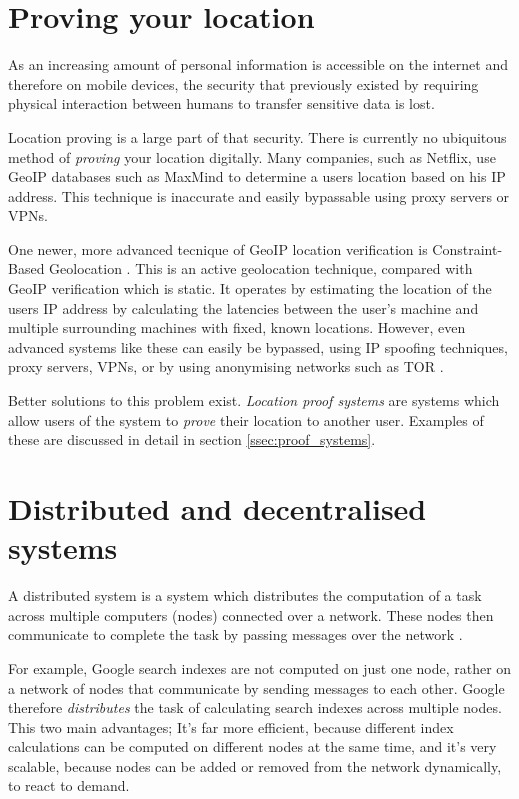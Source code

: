\section{Proving your location}
As an increasing amount of personal information is accessible on the internet and therefore on mobile devices, the security that previously existed by requiring physical interaction between humans to transfer sensitive data is lost.

Location proving is a large part of that security. There is currently no ubiquitous method of \textit{proving} your location digitally. Many companies, such as Netflix, use GeoIP databases such as MaxMind \cite{maxmind} to determine a users location based on his IP address. This technique is inaccurate and easily bypassable using proxy servers or VPNs.

One newer, more advanced tecnique of GeoIP location verification is Constraint-Based Geolocation \cite{constraint-based}. This is an active geolocation technique, compared with GeoIP verification which is static. It operates by estimating the location of the users IP address by calculating the latencies between the user's machine and multiple surrounding machines with fixed, known locations. However, even advanced systems like these can easily be bypassed, using IP spoofing techniques, proxy servers, VPNs, or by using anonymising networks such as TOR \cite{tor}.

Better solutions to this problem exist. \textit{Location proof systems} are systems which allow users of the system to \textit{prove} their location to another user. Examples of these are discussed in detail in section \ref{ssec:proof_systems}.

\section{Distributed and decentralised systems}
A distributed system is a system which distributes the computation of a task across multiple computers (nodes) connected over a network. These nodes then communicate to complete the task by passing messages over the network \cite{distributed}.

For example, Google search indexes are not computed on just one node, rather on a network of nodes that communicate by sending messages to each other. Google therefore \textit{distributes} the task of calculating search indexes across multiple nodes. This two main advantages; It's far more efficient, because different index calculations can be computed on different nodes at the same time, and it's very scalable, because nodes can be added or removed from the network dynamically, to react to demand.

